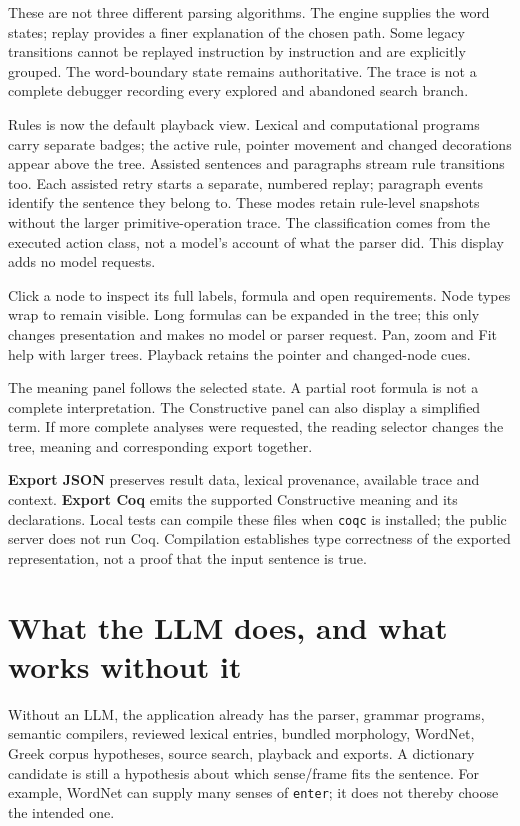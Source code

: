\documentclass[11pt,a4paper]{article}
\begin{document}
These are not three different parsing algorithms. The engine supplies
the word states; replay provides a finer explanation of the chosen path.
Some legacy transitions cannot be replayed instruction by instruction
and are explicitly grouped. The word-boundary state remains
authoritative. The trace is not a complete debugger recording every
explored and abandoned search branch.

Rules is now the default playback view. Lexical and computational
programs carry separate badges; the active rule, pointer movement and
changed decorations appear above the tree. Assisted sentences and
paragraphs stream rule transitions too. Each assisted retry starts a
separate, numbered replay; paragraph events identify the sentence they
belong to. These modes retain rule-level snapshots without the larger
primitive-operation trace. The classification comes from the executed
action class, not a model's account of what the parser did. This display
adds no model requests.

Click a node to inspect its full labels, formula and open requirements.
Node types wrap to remain visible. Long formulas can be expanded in the
tree; this only changes presentation and makes no model or parser
request. Pan, zoom and Fit help with larger trees. Playback retains the
pointer and changed-node cues.

The meaning panel follows the selected state. A partial root formula is
not a complete interpretation. The Constructive panel can also display a
simplified term. If more complete analyses were requested, the reading
selector changes the tree, meaning and corresponding export together.

\textbf{Export JSON} preserves result data, lexical provenance,
available trace and context. \textbf{Export Coq} emits the supported
Constructive meaning and its declarations. Local tests can compile these
files when \texttt{coqc} is installed; the public server does not run
Coq. Compilation establishes type correctness of the exported
representation, not a proof that the input sentence is true.

\section{What the LLM does, and what works without
it}\label{what-the-llm-does-and-what-works-without-it}

Without an LLM, the application already has the parser, grammar
programs, semantic compilers, reviewed lexical entries, bundled
morphology, WordNet, Greek corpus hypotheses, source search, playback
and exports. A dictionary candidate is still a hypothesis about which
sense/frame fits the sentence. For example, WordNet can supply many
senses of \texttt{enter}; it does not thereby choose the intended one.
\end{document}
